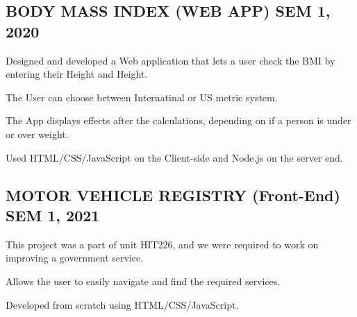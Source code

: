 \documentclass[letter,10pt]{article}
\begin{document}
\subsection{{BODY MASS INDEX (WEB APP) \hfill SEM 1, 2020}}
\begin{zitemize}
\item Designed and developed a Web application that lets a user check the BMI by entering their Height and Height.
\item The User can choose between Internatinal or US metric system.
\item The App displays effects after the calculations, depending on if a person is under or over weight.
\item Used HTML/CSS/JavaScript on the Client-side and Node.js on the server end.
\end{zitemize}

\subsection{{MOTOR VEHICLE REGISTRY (Front-End) \hfill SEM 1, 2021}}
\begin{zitemize}
\item This project was a part of unit HIT226, and we were required to work on improving a government service.
\item Allows the user to easily navigate and find the required services.
\item Developed from scratch using HTML/CSS/JavaScript.
\end{zitemize}
\end{document}
